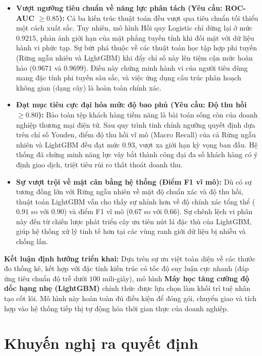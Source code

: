 \documentclass[a4paper,11pt]{article}
\begin{document}
\begin{itemize}[itemsep=4pt, leftmargin=*]
    \item \textbf{Vượt ngưỡng tiêu chuẩn về năng lực phân tách (Yêu cầu: ROC-AUC $\ge 0.85$):}
    Cả ba kiến trúc thuật toán đều vượt qua tiêu chuẩn tối thiểu một cách xuất sắc. Tuy nhiên, mô hình Hồi quy Logistic chỉ dừng lại ở mức $0.9215$, phản ánh giới hạn của mặt phẳng tuyến tính khi đối mặt với dữ liệu hành vi phức tạp. Sự bứt phá thuộc về các thuật toán học tập hợp phi tuyến (Rừng ngẫu nhiên và LightGBM) khi đẩy chỉ số này lên tiệm cận mức hoàn hảo ($0.9671$ và $0.9699$). Điều này chứng minh hành vi của người tiêu dùng mang đặc tính phi tuyến sâu sắc, và việc ứng dụng cấu trúc phân hoạch không gian (dạng cây) là hoàn toàn chính xác.

    \item \textbf{Đạt mục tiêu cực đại hóa mức độ bao phủ (Yêu cầu: Độ thu hồi $\ge 0.80$):}
    Bảo toàn tệp khách hàng tiềm năng là bài toán sống còn của doanh nghiệp thương mại điện tử. Sau quy trình tinh chỉnh ngưỡng quyết định dựa trên chỉ số Youden, điểm độ thu hồi vĩ mô (Macro Recall) của cả Rừng ngẫu nhiên và LightGBM đều đạt mức $0.93$, vượt xa giới hạn kỳ vọng ban đầu. Hệ thống đã chứng minh năng lực vây bắt thành công đại đa số khách hàng có ý định giao dịch, triệt tiêu rủi ro thất thoát doanh thu.

    \item \textbf{Sự vượt trội về mặt cân bằng hệ thống (Điểm F1 vĩ mô):}
    Dù có sự tương đồng lớn với Rừng ngẫu nhiên về mặt độ chuẩn xác và độ thu hồi, thuật toán LightGBM vẫn cho thấy sự nhỉnh hơn về độ chính xác tổng thể ($0.91$ so với $0.90$) và điểm F1 vĩ mô ($0.67$ so với $0.66$). Sự chênh lệch vi phân này đến từ chiến lược phát triển cây ưu tiên nút lá đặc thù của LightGBM, giúp hệ thống xử lý tinh tế hơn tại các vùng ranh giới dữ liệu bị nhiễu và chồng lấn.
\end{itemize}

\textbf{Kết luận định hướng triển khai:} Dựa trên sự ưu việt toàn diện về các thước đo thống kê, kết hợp với đặc tính kiến trúc có tốc độ suy luận cực nhanh (đáp ứng tiêu chuẩn độ trễ dưới $100$ mili-giây), mô hình \textbf{Máy học tăng cường độ dốc hạng nhẹ (LightGBM)} chính thức được lựa chọn làm khối trí tuệ nhân tạo cốt lõi. Mô hình này hoàn toàn đủ điều kiện để đóng gói, chuyển giao và tích hợp vào hệ thống tiếp thị tự động hóa thời gian thực của doanh nghiệp.
\section{Khuyến nghị ra quyết định}
\end{document}
